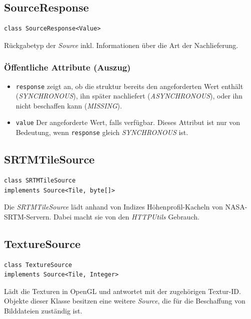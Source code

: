 \documentclass[10pt]{scrreprt}
\begin{document}
\vspace{5mm}
\subsection*{SourceResponse}
\begin{lstlisting}
class SourceResponse<Value>
\end{lstlisting}
Rückgabetyp der \textit{Source} inkl. Informationen über die Art der Nachlieferung.\\
\subsubsection*{Öffentliche Attribute (Auszug)}
\begin{itemize}
\item\texttt{response} zeigt an, ob die struktur bereits den angeforderten Wert enthält (\textit{SYNCHRONOUS}), ihn später nachliefert (\textit{ASYNCHRONOUS}), oder ihn nicht beschaffen kann (\textit{MISSING}).
\item\texttt{value} Der angeforderte Wert, falls verfügbar. Dieses Attribut ist nur von Bedeutung, wenn \texttt{response} gleich \textit{SYNCHRONOUS} ist.
\end{itemize}

\vspace{5mm}
\subsection*{SRTMTileSource}
\begin{lstlisting}
class SRTMTileSource
implements Source<Tile, byte[]>
\end{lstlisting}
Die \textit{SRTMTileSource} lädt anhand von Indizes Höhenprofil-Kacheln von NASA-SRTM-Servern. Dabei macht sie von den \textit{HTTPUtils} Gebrauch.\\

\vspace{5mm}
\subsection*{TextureSource}
\begin{lstlisting}
class TextureSource
implements Source<Tile, Integer>
\end{lstlisting}
Lädt die Texturen in OpenGL und antwortet mit der zugehörigen Textur-ID. Objekte dieser Klasse besitzen eine weitere \textit{Source}, die für die Beschaffung von Bilddateien zuständig ist. \\
\end{document}
